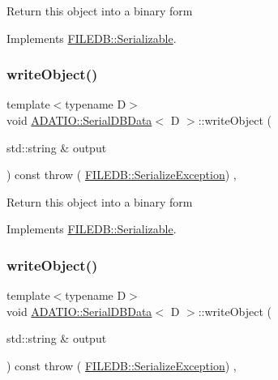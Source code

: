 Return this object into a binary form 

Implements \mbox{\hyperlink{classFILEDB_1_1Serializable_a8deaa86e108c08c863881e46cf5578ea}{F\+I\+L\+E\+D\+B\+::\+Serializable}}.

\mbox{\label{classADATIO_1_1SerialDBData_a5266e4f1c065f0776f9974d6fad51a2f}} 
\subsubsection{\texorpdfstring{writeObject()}{writeObject()}\hspace{0.1cm}{\footnotesize\ttfamily [2/3]}}
{\footnotesize\ttfamily template$<$typename D$>$ \\
void \mbox{\hyperlink{classADATIO_1_1SerialDBData}{A\+D\+A\+T\+I\+O\+::\+Serial\+D\+B\+Data}}$<$ D $>$\+::write\+Object (\begin{DoxyParamCaption}\item[{std\+::string \&}]{output }\end{DoxyParamCaption}) const throw ( \mbox{\hyperlink{classFILEDB_1_1SerializeException}{F\+I\+L\+E\+D\+B\+::\+Serialize\+Exception}}) \hspace{0.3cm}{\ttfamily [inline]}, {\ttfamily [virtual]}}

Return this object into a binary form 

Implements \mbox{\hyperlink{classFILEDB_1_1Serializable_a8deaa86e108c08c863881e46cf5578ea}{F\+I\+L\+E\+D\+B\+::\+Serializable}}.

\mbox{\label{classADATIO_1_1SerialDBData_a5266e4f1c065f0776f9974d6fad51a2f}} 
\subsubsection{\texorpdfstring{writeObject()}{writeObject()}\hspace{0.1cm}{\footnotesize\ttfamily [3/3]}}
{\footnotesize\ttfamily template$<$typename D$>$ \\
void \mbox{\hyperlink{classADATIO_1_1SerialDBData}{A\+D\+A\+T\+I\+O\+::\+Serial\+D\+B\+Data}}$<$ D $>$\+::write\+Object (\begin{DoxyParamCaption}\item[{std\+::string \&}]{output }\end{DoxyParamCaption}) const throw ( \mbox{\hyperlink{classFILEDB_1_1SerializeException}{F\+I\+L\+E\+D\+B\+::\+Serialize\+Exception}}) \hspace{0.3cm}{\ttfamily [inline]}, {\ttfamily [virtual]}}

